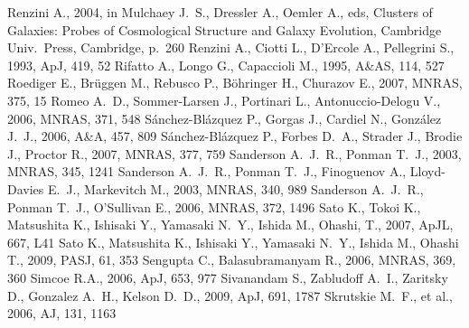 \documentclass[useAMS,usenatbib]{mn2e}
\begin{document}
\begin{thebibliography}{}
   Renzini A., 2004, in  Mulchaey J.~S., Dressler A., Oemler A., eds,
   Clusters of Galaxies: Probes of Cosmological Structure and Galaxy Evolution,
   Cambridge Univ.\ Press, Cambridge, p.~260  
   Renzini A., Ciotti L., D'Ercole A., Pellegrini S., 1993, ApJ, 419, 52  
   Rifatto A., Longo G., Capaccioli M., 1995, A\&AS, 114, 527 
   Roediger E., Br{\"u}ggen M., Rebusco P., B{\"o}hringer H., Churazov E.,
   2007, MNRAS, 375, 15 
   Romeo A.~D., Sommer-Larsen J., Portinari L., Antonuccio-Delogu V., 2006, 
   MNRAS, 371, 548
   S{\'a}nchez-Bl{\'a}zquez P., Gorgas J., Cardiel N., Gonz{\'a}lez J.~J., 
   2006, A\&A, 457, 809 
   S{\'a}nchez-Bl{\'a}zquez P., Forbes D.~A., Strader J., Brodie J., 
   Proctor R., 2007, MNRAS, 377, 759 
   Sanderson A.~J.~R., Ponman T.~J., 2003, MNRAS, 345, 1241 
   Sanderson A.~J.~R., Ponman T.~J., Finoguenov A., Lloyd-Davies E.~J., 
   Markevitch M., 2003, MNRAS, 340, 989
   Sanderson A.~J.~R., Ponman T.~J., O'Sullivan E., 2006, MNRAS, 372, 1496
   Sato K., Tokoi K., Matsushita K., Ishisaki Y., Yamasaki N.~Y., Ishida M., 
   Ohashi, T., 2007, ApJL, 667, L41 
   Sato K., Matsushita K., Ishisaki Y., Yamasaki N.~Y., Ishida M., Ohashi T.,
   2009, PASJ, 61, 353
   Sengupta C., Balasubramanyam R., 2006, MNRAS, 369, 360 
   Simcoe R.A., 2006, ApJ, 653, 977 
   Sivanandam S., Zabludoff A.~I., Zaritsky D., Gonzalez A.~H., Kelson D.~D., 
   2009, ApJ, 691, 1787
   Skrutskie M.~F., et al., 2006, AJ, 131, 1163 

\end{thebibliography}
\end{document}
